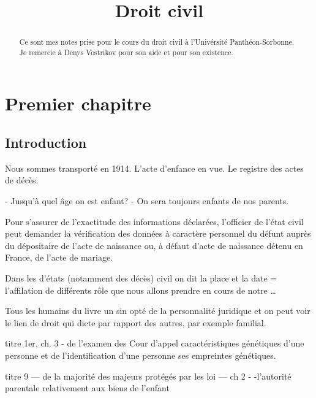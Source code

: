 \documentclass[a4paper]{report}
\title{Droit civil}
\begin{document}
\maketitle
\begin{abstract}

    Ce sont mes notes prise pour le cours du droit civil à l'Univérsité Panthéon-Sorbonne. Je remercie à Denys Vostrikov pour son aide et pour son existence.
\end{abstract}
\tableofcontents
\chapter{Premier chapitre}\label{ch:first-chapter}
\section{Introduction}%
\label{sec:Introduction}

Nous sommes transporté en 1914. L'acte d'enfance en vue. Le registre des actes de décès.


- Jusqu'à quel âge on est enfant? - On sera toujours enfants de nos parents.

Pour s'assurer de l'exactitude des informations déclarées, l'officier de l'état civil peut demander la vérification des données à caractère personnel du défunt auprès du dépositaire de l'acte de naissance ou, à défaut d'acte de naissance détenu en France, de l'acte de mariage.


Dans les d'états (notamment des décès) civil on dit la place et la date = l'affilation de différents rôle que nous allons prendre en cours de notre \ldots

Tous les humains du livre un sin opté de la personnalité juridique et on peut voir le lien de droit qui dicte par rapport des autres, par exemple familial.

titre 1er, ch. 3 - de l'examen des Cour d'appel caractéristiques génétiques d'une personne et de l'identification d'une personne ses empreintes génétiques.

titre 9 --- de la majorité des majeurs protégés par les loi ---
ch 2 - -l'autorité parentale relativement aux biens de l'enfant 
\end{document}
